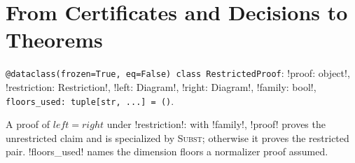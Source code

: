 \section{From Certificates and Decisions to Theorems}\label{sec:kernel-check}

\begin{signature}
\texttt{@dataclass(\allowbreak{}frozen=True,\allowbreak{} eq=False) class RestrictedProof}: \py!proof: object!, \py!restriction: Restriction!, \py!left: Diagram!, \py!right: Diagram!, \py!family: bool!, \texttt{floors\_\allowbreak{}used: tuple[str,\allowbreak{} .\allowbreak{}.\allowbreak{}.\allowbreak{}] = (\allowbreak{})}.

A proof of $\mathit{left}=\mathit{right}$ under \code!restriction!: with \code!family!, \code!proof! proves the unrestricted claim and is specialized by \textsc{Subst}; otherwise it proves the restricted pair. \code!floors_used! names the dimension floors a normalizer proof assumed.
\end{signature}

